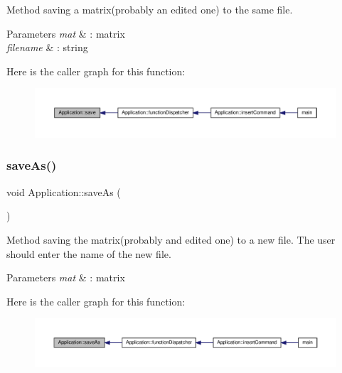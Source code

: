Method saving a matrix(probably an edited one) to the same file. 
\begin{DoxyParams}{Parameters}
{\em mat} & \+: matrix \\
\hline
{\em filename} & \+: string \\
\hline
\end{DoxyParams}
Here is the caller graph for this function\+:\nopagebreak
\begin{figure}[H]
\begin{center}
\leavevmode
\includegraphics[width=350pt]{class_application_a2cbf94e01d55a814de35f90f4d874647_icgraph}
\end{center}
\end{figure}
\mbox{\label{class_application_a10d5a48c95593cee25c1b9e0e257b5a7}} 
\subsubsection{\texorpdfstring{save\+As()}{saveAs()}}
{\footnotesize\ttfamily void Application\+::save\+As (\begin{DoxyParamCaption}{ }\end{DoxyParamCaption})\hspace{0.3cm}{\ttfamily [private]}}

Method saving the matrix(probably and edited one) to a new file. The user should enter the name of the new file. 
\begin{DoxyParams}{Parameters}
{\em mat} & \+: matrix \\
\hline
\end{DoxyParams}
Here is the caller graph for this function\+:\nopagebreak
\begin{figure}[H]
\begin{center}
\leavevmode
\includegraphics[width=350pt]{class_application_a10d5a48c95593cee25c1b9e0e257b5a7_icgraph}
\end{center}
\end{figure}
\mbox{\label{class_application_ae652f7ff140c5a74c3806f728e9a18f3}} 
